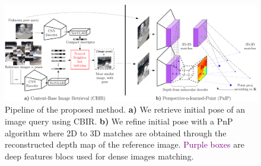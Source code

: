 \begin{figure}
	\centering
	\includegraphics[width=\linewidth]{method/pipeline}	
	\caption[Pipeline of our pose refinement method]{\label{fig:pipeline} Pipeline of the proposed method. \textbf{a)} We retrieve initial pose of an image query using CBIR. \textbf{b)} We refine initial pose with a PnP algorithm where 2D to 3D matches are obtained through the reconstructed depth map of the reference image. \textcolor{purple}{Purple boxes} are deep features blocs used for dense images matching.}
\end{figure}
